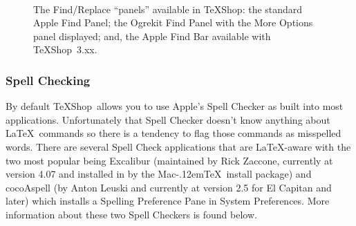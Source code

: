 \documentclass[letterpaper,11pt]{article}
\newcommand{\MacTeX}{Mac\kern-.12em\TeX}
\newcommand{\TS}{\textsf{\TeX Shop}}
\newcommand{\cmd}[1]{\textsf{#1}}
\begin{document}
\begin{figure}
\centering
{}%
\qquad%
%
\\[5pt]
\caption[Find/Replace Panels.]{The Find/Replace ``panels'' available in \TS: 
 the standard Apple Find Panel; 
 the Ogrekit Find Panel with the \cmd{More Options} panel displayed; and, 
 the Apple Find Bar available with \TS\ 3.xx.}
\label{fig:FindPanels}
\end{figure}

\subsubsection{Spell Checking}

By default \TS\ allows you to use Apple's Spell Checker as built into most applications. Unfortunately that Spell Checker doesn't know anything about \LaTeX\ commands so there is a tendency to flag those commands as misspelled words. There are several Spell Check applications that are \LaTeX-aware with the two most popular being \cmd{Excalibur} (maintained by Rick Zaccone, currently at version 4.07 and installed in  by the \MacTeX\ install package) and \cmd{cocoAspell} (by Anton Leuski and currently at version 2.5 for \cmd{El Capitan} and later) which installs a \cmd{Spelling} Preference Pane in \cmd{System Preferences}. More information about these two Spell Checkers is found below.
\end{document}
